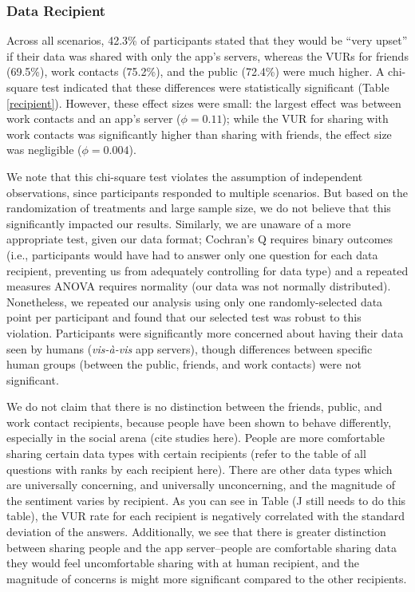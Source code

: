 
\subsubsection{Data Recipient}
Across all scenarios, 42.3\% of participants stated that they would be ``very upset'' if their data was shared with only the app's servers, whereas the VURs for friends (69.5\%), work contacts (75.2\%), and the public (72.4\%) were much higher. A chi-square test indicated that these differences were statistically significant (Table \ref{recipient}). However, these effect sizes were small: the largest effect was between work contacts and an app's server ($\phi=0.11$); while the VUR for sharing with work contacts was significantly higher than sharing with friends, the effect size was negligible ($\phi=0.004$). 

We note that this chi-square test violates the assumption of independent observations, since participants responded to multiple scenarios. But based on the randomization of treatments and large sample size, we do not believe that this significantly impacted our results. Similarly, we are unaware of a more appropriate test, given our data format; Cochran's Q requires binary outcomes (i.e., participants would have had to answer only one question for each data recipient, preventing us from adequately controlling for data type) and a repeated measures ANOVA requires normality (our data was not normally distributed). Nonetheless, we repeated our analysis using only one randomly-selected data point per participant and found that our selected test was robust to this violation. Participants were significantly more concerned about having their data seen by humans ({\it vis-{\`a}-vis} app servers), though differences between specific human groups (between the public, friends, and work contacts) were not significant. 

{\color {red} We do not claim that there is no distinction between the friends, public, and work contact recipients, because people have been shown to behave differently, especially in the social arena (cite studies here). People are more comfortable sharing certain data types with certain recipients (refer to the table of all questions with ranks by each recipient here). There are other data types which are universally concerning, and universally unconcerning, and the magnitude of the sentiment varies by recipient. As you can see in Table (J still needs to do this table), the VUR rate for each recipient is negatively correlated with the standard deviation of the answers.  Additionally, we see that there is greater distinction between sharing people and the app server--people are comfortable sharing data they would feel uncomfortable sharing with at human recipient, and the magnitude of concerns is might more significant compared to the other recipients.}

